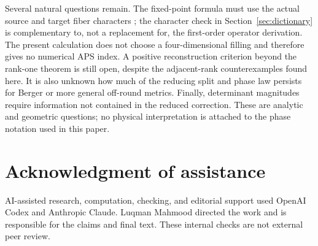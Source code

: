 \documentclass[11pt]{article}
\theoremstyle{definition}
\begin{document}
Several natural questions remain. The fixed-point formula must use the actual
source and target fiber characters \cite[Sec.~4.5]{GilkeyBook1984}; the
character check in Section~\ref{sec:dictionary} is complementary to, not a
replacement for, the first-order operator derivation. The present calculation does not choose a
four-dimensional filling and therefore gives no numerical APS index.  A
positive reconstruction criterion beyond the rank-one theorem is still open,
despite the adjacent-rank counterexamples found here.  It is also unknown how
much of the reducing split and phase law persists for Berger or more general
off-round metrics.  Finally, determinant magnitudes require information not
contained in the reduced correction.  These are analytic and geometric
questions; no physical interpretation is attached to the phase notation used
in this paper.

\section*{Acknowledgment of assistance}
AI-assisted research, computation, checking, and editorial support used
OpenAI Codex and Anthropic Claude. Luqman Mahmood directed the work
and is responsible for the claims and final text. These internal
checks are not external peer review.



\end{document}
